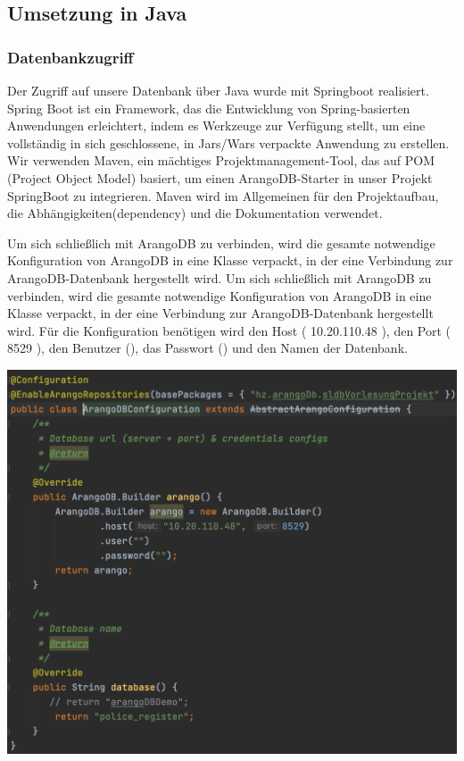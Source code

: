 \subsection{Umsetzung in Java}
\subsubsection{Datenbankzugriff}
Der Zugriff auf unsere Datenbank über Java wurde mit Springboot realisiert. Spring Boot ist ein Framework, das die Entwicklung von Spring-basierten Anwendungen erleichtert, indem es Werkzeuge zur Verfügung stellt, um eine vollständig in sich geschlossene, in Jars/Wars verpackte Anwendung zu erstellen. Wir verwenden Maven, ein mächtiges Projektmanagement-Tool, das auf  POM (Project Object Model) basiert, um einen ArangoDB-Starter in unser Projekt SpringBoot zu integrieren. Maven wird im Allgemeinen für den Projektaufbau, die Abhängigkeiten(dependency) und die Dokumentation verwendet.

Um sich schließlich mit ArangoDB zu verbinden, wird die gesamte notwendige Konfiguration von ArangoDB in eine Klasse verpackt, in der eine Verbindung zur ArangoDB-Datenbank hergestellt wird. Um sich schließlich mit ArangoDB zu verbinden, wird die gesamte notwendige Konfiguration von ArangoDB in eine Klasse verpackt, in der eine Verbindung zur ArangoDB-Datenbank hergestellt wird. Für die Konfiguration benötigen wird den Host ( 10.20.110.48 ), den Port ( 8529 ), den Benutzer (),  das Passwort () und den Namen der Datenbank.

\begin{center}
\includegraphics[scale=.4]{images/dbConfig}
\end{center}

